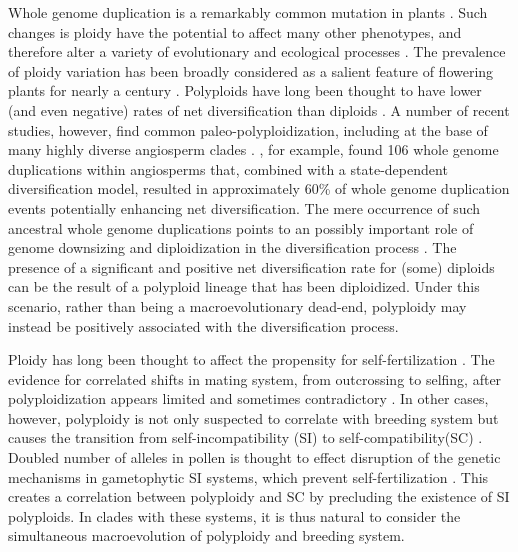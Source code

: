 Whole genome duplication is a remarkably common mutation in plants \citep{husband_2013, zenilferguson_2017}.
Such changes is ploidy have the potential to affect many other phenotypes, and therefore alter a variety of evolutionary \citep{ramsey_2002} and ecological processes \citep{sessa_2019}.
The prevalence of ploidy variation has been broadly considered as a salient feature of flowering plants for nearly a century \citep{stebbins1938}. 
Polyploids have long been thought to have lower (and even negative) rates of net diversification than diploids \citet{mayrose_2011, mayrose_2015}. 
A number of recent studies, however, find common paleo-polyploidization, including at the base of many highly diverse angiosperm clades \citep{soltis_2014}. 
\citet{landis_2018}, for example, found 106 whole genome duplications within angiosperms that, combined with a state-dependent diversification model, resulted in approximately 60\% of whole genome duplication events potentially enhancing net diversification.
The mere occurrence of such ancestral whole genome duplications points to an possibly important role of genome downsizing and diploidization in the diversification process \citep{soltis_2015diploidization, dodsworth_2015}. 
The presence of a significant and positive net diversification rate for (some) diploids can be  the result of a polyploid lineage that has been diploidized. 
Under this scenario, rather than being a macroevolutionary dead-end, polyploidy may instead be positively associated with the diversification process. 

Ploidy has long been thought to affect the propensity for self-fertilization \citep{stebbins1950}. 
The evidence for correlated shifts in mating system, from outcrossing to selfing, after polyploidization appears limited and sometimes contradictory \citep{barringer2007, barrett2008, husband2008}.
In other cases, however, polyploidy is not only suspected to correlate with breeding system but causes the transition from self-incompatibility (SI) to self-compatibility(SC) \citep{stout1942, lewis1947}.
Doubled number of alleles in pollen is thought to effect disruption of the genetic mechanisms in gametophytic SI systems, which prevent self-fertilization \citep{entani1999, tsukamoto2005, kubo2010}. 
This creates a correlation between polyploidy and SC by precluding the existence of SI polyploids.
In clades with these systems, it is thus natural to consider the simultaneous macroevolution of polyploidy and breeding system.

